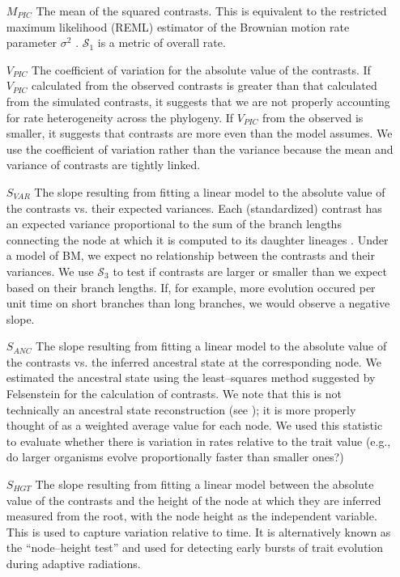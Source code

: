 \documentclass[a4paper,12pt]{article}
\begin{document}
\begin{enumerate}
\item[$M_{PIC}$] The mean of the squared contrasts. This is equivalent to the restricted maximum likelihood (REML) estimator of the Brownian motion rate parameter $\sigma^2$ \citep{Garland1992, Rohlf2001}. $\mathcal{S}_1$ is a metric of overall rate.

\item[$V_{PIC}$] The coefficient of variation for the absolute value of the contrasts. If $V_{PIC}$ calculated from the observed contrasts is greater than that calculated from the simulated contrasts, it suggests that we are not properly accounting for rate heterogeneity across the phylogeny. If $V_{PIC}$ from the observed is smaller, it suggests that contrasts are more even than the model assumes. We use the coefficient of variation rather than the variance because the mean and variance of contrasts are tightly linked.

\item[$S_{VAR}$] The slope resulting from fitting a linear model to the absolute value of the contrasts vs. their expected variances. Each (standardized) contrast has an expected variance proportional to the sum of the branch lengths connecting the node at which it is computed to its daughter lineages  \citep{Felsenstein1985}. Under a model of BM, we expect no relationship between the contrasts and their variances. We use $\mathcal{S}_3$ to test if contrasts are larger or smaller than we expect based on their branch lengths. If, for example, more evolution occured per unit time on short branches than long branches, we would observe a negative slope.

\item[$S_{ANC}$] The slope resulting from fitting a linear model to the absolute value of the contrasts vs. the inferred ancestral state at the corresponding node. We estimated the ancestral state using the least--squares method suggested by Felsenstein \citep{Felsenstein1985} for the calculation of contrasts. We note that this is not technically an ancestral state reconstruction (see \citep{Felsenstein1985}); it is more properly thought of as a weighted average value for each node. We used this statistic to evaluate whether there is variation in rates relative to the trait value (e.g., do larger organisms evolve proportionally faster than smaller ones?)

\item[$S_{HGT}$] The slope resulting from fitting a linear model between the absolute value of the contrasts and the height of the node at which they are inferred measured from the root, with the node height as the independent variable. This is used to capture variation relative to time. It is alternatively known as the ``node--height test'' \citep{FreckletonHarvey2006, SlaterPennell} and used for detecting early bursts of trait evolution during adaptive radiations. 


\end{enumerate}
\end{document}
